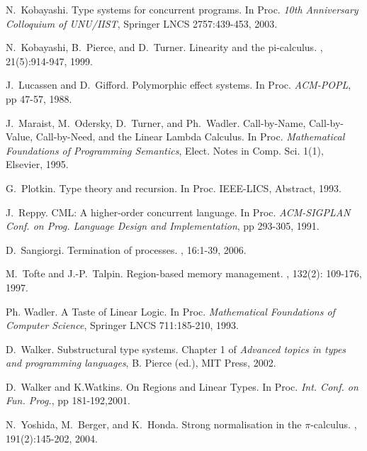 \documentclass[11pt]{article}
\begin{document}
{\begin{thebibliography}{99}
N.~Kobayashi.
\newblock Type systems for concurrent programs.
\newblock In Proc. {\em 10th Anniversary Colloquium of UNU/IIST}, 
Springer LNCS 2757:439-453, 2003.

N.~Kobayashi, B.~Pierce, and  D.~Turner. 
\newblock Linearity and the pi-calculus.
,
21(5):914-947, 1999.


J.~Lucassen and D.~Gifford.
\newblock Polymorphic effect systems.
\newblock In Proc. {\em ACM-POPL}, pp 47-57, 1988.


J.~Maraist, M.~Odersky, D.~Turner, and  Ph.~Wadler.
\newblock Call-by-Name, Call-by-Value, Call-by-Need, and the Linear Lambda Calculus.
\newblock In Proc. {\em Mathematical Foundations of Programming Semantics},  
Elect. Notes in Comp. Sci. 1(1), Elsevier, 1995.

G.~Plotkin.
\newblock Type theory and recursion.
\newblock In Proc. {IEEE-LICS}, Abstract, 1993.

J.~Reppy.
\newblock CML: A higher-order concurrent language.
\newblock In Proc. {\em ACM-SIGPLAN Conf. on Prog. Language Design and Implementation}, 
pp 293-305, 1991. 

D.~Sangiorgi.
\newblock Termination of processes.
,
16:1-39, 2006.

M.~Tofte and J.-P.~Talpin.
\newblock Region-based memory management. 
, 132(2): 109-176, 1997.


Ph. Wadler.
\newblock A Taste of Linear Logic. 
\newblock In Proc. {\em Mathematical Foundations of Computer Science},
Springer LNCS 711:185-210, 1993.


D.~Walker.
\newblock Substructural type systems.
\newblock Chapter 1 of {\em Advanced topics in types and programming languages},
B. Pierce (ed.), MIT Press, 2002.

D.~Walker and K.Watkins.
\newblock On Regions and Linear Types. 
\newblock In Proc. {\em Int. Conf. on Fun. Prog.}, pp 181-192,2001.

N.~Yoshida, M.~Berger, and K.~Honda.
\newblock Strong normalisation in the $\pi$-calculus. 
, 191(2):145-202, 2004.


\end{thebibliography}}
\end{document}
